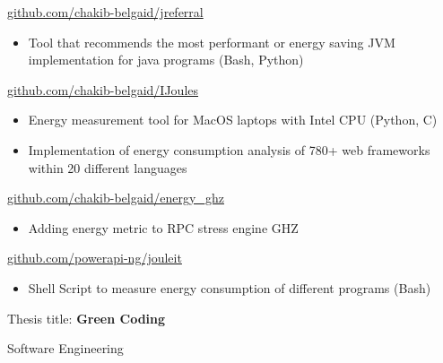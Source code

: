 \documentclass[10pt,a4paper,ragged2e,withhyper]{altacv}
\begin{document}
\begin{paracol}{2}
  \divider
   {\href{https://github.com/chakib-belgaid/jreferral}{github.com/chakib-belgaid/jreferral}}{}{}
  \begin{itemize}
    \item  Tool that recommends the most performant or energy saving JVM implementation for java programs (Bash, Python)
  \end{itemize}

  \divider
   {\href{https://github.com/chakib-belgaid/IJoules}{github.com/chakib-belgaid/IJoules}}{}{}
  \begin{itemize}
    \item  Energy measurement tool for MacOS laptops with Intel CPU (Python, C)
  \end{itemize}

  \divider
  \begin{itemize}
    \item  Implementation of energy consumption analysis of 780+ web frameworks within 20 different languages
  \end{itemize}

  \divider
   {\href{https://github.com/chakib-belgaid/energy_ghz}{github.com/chakib-belgaid/energy\_ghz}}{}{}
  \begin{itemize}
    \item  Adding energy metric to RPC stress engine GHZ \end{itemize}
  \divider
   {\href{https://github.com/powerapi-ng/jouleit}{github.com/powerapi-ng/jouleit}}{}{}
  \begin{itemize}
    \item  Shell Script to measure energy consumption of different programs (Bash)
  \end{itemize}



  \medskip

  Thesis title: \textbf{Green Coding}

  \divider

  Software Engineering

  \divider


\end{paracol}
\end{document}
